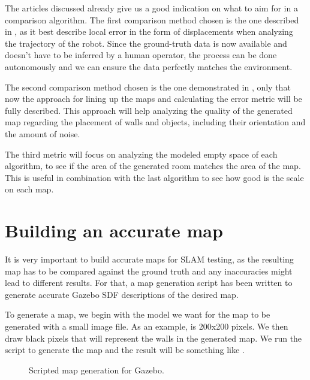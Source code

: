 The articles discussed already give us a good indication on what to aim for in a comparison algorithm. The first comparison method chosen is the one described in \cite{kummerle2009measuring}, as it best describe local error in the form of displacements when analyzing the trajectory of the robot. Since the ground-truth data is now available and doesn't have to be inferred by a human operator, the process can be done autonomously and we can ensure the data perfectly matches the environment.

The second comparison method chosen is the one demonstrated in \cite{santos2013evaluation}, only that now the approach for lining up the maps and calculating the error metric will be fully described. This approach will help analyzing the quality of the generated map regarding the placement of walls and objects, including their orientation and the amount of noise.

The third metric will focus on analyzing the modeled empty space of each algorithm, to see if the area of the generated room matches the area of the map. This is useful in combination with the last algorithm to see how good is the scale on each map.

\section{Building an accurate map}

It is very important to build accurate maps for SLAM testing, as the resulting map has to be compared against the ground truth and any inaccuracies might lead to different results. For that, a map generation script has been written to generate accurate Gazebo SDF descriptions of the desired map.

To generate a map, we begin with the model we want for the map to be generated with a small image file. As an example,  is 200x200 pixels. We then draw black pixels that will represent the walls in the generated map. We run the script to generate the map and the result will be something like .

\begin{figure}[!ht]
     \centering
     \hfill
     \caption{Scripted map generation for Gazebo.}
     \label{fig:map_generation_script}
\end{figure}

